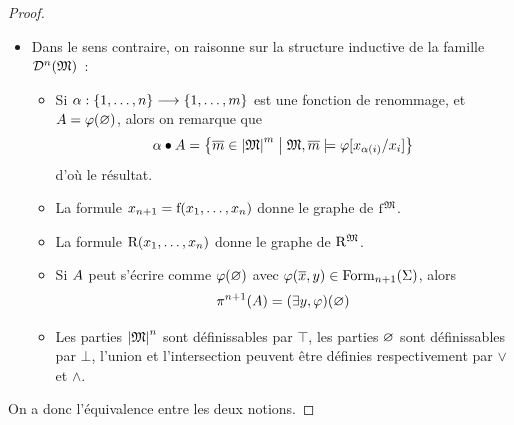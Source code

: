 \begin{proof}
\begin{itemize}
\begin{itemize}
\begin{itemize}
      \end{itemize}
    \item On sait donc que les termes ont des graphes dans
      $\powerdef^{n+1}(\varMM)$. En réutilisant la même construction, on
      peut composer les graphes des différents $\toM{t_i}$ et de $\toM{\symbR}$
      pour en déduire que le graphe induit par $\symbR(t_1,\ldots,t_n)$ est
      dans $\powerdef^{n}(\varMM)$.
    \item Les connecteurs logiques correspondent exactement aux opérations
      d'une algèbre de Boole (en incluant $\top$ et $\bot$), le résultat est
      donc direct par le dernier point.
    \item Pour une quantification universelle, on se ramène directement
      à des négations et une quantification existentielle.
    \item Si l'interprétation de $\varFF(\vec x,y)$ est dans
      $\powerdef^{n+1}(\varMM)$, alors l'interprétation de la formule
      $\exists y,\varFF(\vec x,y)$ est exactement
      $\projP{}{n+1}(\varPt)$ avec $\varPt$ l'interprétation de $\varFF$.
    \end{itemize}
  \item[\fbox{$\supseteq$}] Dans le sens contraire, on raisonne sur la
    structure inductive de la famille $\powerdef^{n}(\varMM)$~:
    \begin{itemize}
    \item Si $\alpha : \displaystyle \{1,\ldots,n\} \longrightarrow \{1,\ldots,m\}$ est
      une fonction de renommage, et $A = \varphi(\varnothing)$, alors on
      remarque que
      \[\alpha\mathbin{\bullet}A =
      \left\{ \overline{m} \in \left\vert \mathfrak{M}\right\vert^{m} \;\middle\vert\; \mathfrak{M},\overline{m} \models \varphi[x_{\alpha(i)}/x_i] \right\}\]
      d'où le résultat.
    \item La formule $x_{n+1} = \mathrm{f}(x_1,\ldots,x_n)$ donne le graphe de
      $\mathrm{f}^{\mathfrak{M}}$.
    \item La formule $\mathrm{R}(x_1,\ldots,x_n)$ donne le graphe de
      $\toM{\symbR}$.
    \item Si $\varPt$ peut s'écrire comme $\varphi(\varnothing)$ avec
      $\varphi(\overline{x},y)\in\operatorname{Form}_{n+1}(\Sigma)$, alors
      \[\mathop{\pi_{}^{n+1}}(A) = (\exists y,\varphi)(\varnothing)\]
    \item Les parties $\left\vert \mathfrak{M}\right\vert^n$ sont définissables par $\top$, les parties
      $\varnothing$ sont définissables par $\bot$, l'union et l'intersection peuvent
      être définies respectivement par $\lor$ et $\land$.
    \end{itemize}
  \end{itemize}
  On a donc l'équivalence entre les deux notions.
\end{proof}

